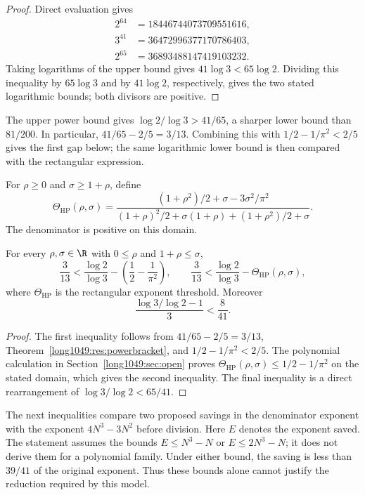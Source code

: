 \begin{proof}
Direct evaluation gives
\[
 \begin{aligned}
 2^{64}&=18446744073709551616,\\
 3^{41}&=36472996377170786403,\\
 2^{65}&=36893488147419103232.
 \end{aligned}
\]
Taking logarithms of the upper bound gives $41\log3<65\log2$.
Dividing this inequality by $65\log3$ and by $41\log2$, respectively,
gives the two stated logarithmic bounds; both divisors are positive.
\end{proof}

The upper power bound gives $\log2/\log3>41/65$, a sharper lower
bound than $81/200$. In particular,
$41/65-2/5=3/13$. Combining this with
$1/2-1/\pi^2<2/5$ gives the first gap below; the same logarithmic
lower bound is then compared with the rectangular expression.

For $\rho\ge0$ and $\sigma\ge1+\rho$, define
\[
 \Theta_{\mathrm{HP}}(\rho,\sigma)=
 \frac{(1+\rho^2)/2+\sigma-3\sigma^2/\pi^2}
 {(1+\rho)^2/2+\sigma(1+\rho)+(1+\rho^2)/2+\sigma}.
\]
The denominator is positive on this domain.

\begin{corollary}\label{long1049:res:sharpgaps}
For every $\rho,\sigma\in\R$ with $0\le\rho$ and $1+\rho\le\sigma$,
\[
 \frac3{13}<\frac{\log2}{\log3}
   -\left(\frac12-\frac1{\pi^2}\right),
 \qquad
 \frac3{13}<\frac{\log2}{\log3}-\Theta_{\mathrm{HP}}(\rho,\sigma),
\]
where $\Theta_{\mathrm{HP}}$ is the rectangular exponent threshold.  Moreover
\[
 \frac{\log3/\log2-1}{3}<\frac8{41}.
\]
\end{corollary}

\begin{proof}
The first inequality follows from
$41/65-2/5=3/13$, Theorem~\ref{long1049:res:powerbracket}, and
$1/2-1/\pi^2<2/5$. The polynomial calculation in
Section~\ref{long1049:sec:open} proves
$\Theta_{\mathrm{HP}}(\rho,\sigma)\le1/2-1/\pi^2$ on the stated
domain, which gives the second inequality.  The final inequality is a direct
rearrangement of $\log3/\log2<65/41$.
\end{proof}

The next inequalities compare two proposed savings in the denominator
exponent with the exponent $4N^3-3N^2$ before division. Here $E$ denotes
the exponent saved. The statement assumes the bounds $E\le N^3-N$ or
$E\le2N^3-N$; it does not derive them for a polynomial family. Under either
bound, the saving is less than $39/41$ of the original exponent. Thus
these bounds alone cannot justify the reduction required by this model.

